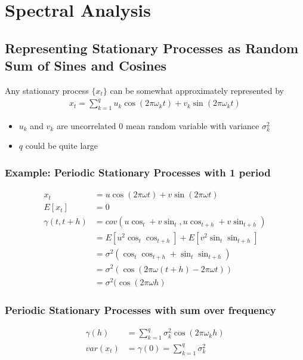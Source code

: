 \chapter{Spectral Analysis} 

\section{Representing Stationary Processes as Random Sum of Sines and Cosines} 
Any stationary process $\{ x_t \}$ can be somewhat approximately represented by 
    \begin{align*}
        x_t = \sum_{k=1}^q u_k \cos(2\pi \omega_k t) + v_k \sin(2\pi \omega_k t)
    \end{align*}
    \begin{itemize}
        \item $u_k$ and $v_k$ are uncorrelated 0 mean random variable with variance $\sigma_k^2$
        \item $q$ could be quite large
    \end{itemize}

\subsection{Example: Periodic Stationary Processes with 1 period} 
    \begin{align*}
        x_t 
        & = u \cos(2\pi \omega t) + v\sin(2\pi\omega t)\\
        E[x_t] 
        & = 0\\
        \gamma(t, t+h) 
        & = cov(u \cos_t + v \sin_t, u\cos_{t+h} + v\sin_{t+h})\\
        & = E[u^2 \cos_t \cos_{t+h}] + E[v^2\sin_t \sin_{t+h}] \\
        & = \sigma^2 (\cos_t \cos_{t+h} + \sin_t \sin_{t+h}) \\
        & = \sigma^2 (\cos(2\pi \omega (t + h) - 2\pi\omega t )) \tag{trig identity of $cos(a-b)$}\\
        & = \sigma^2(\cos(2\pi\omega h) \tag{Stationary, because no $t$} 
    \end{align*}

\subsection{Periodic Stationary Processes with sum over frequency} 
    \begin{align*}
        \gamma(h) & = \sum_{k=1}^q \sigma_k^2 \cos(2\pi\omega_k h) \\
        var(x_t) & = \gamma(0) = \sum_{k=1}^q \sigma_k^2
    \end{align*}
    
